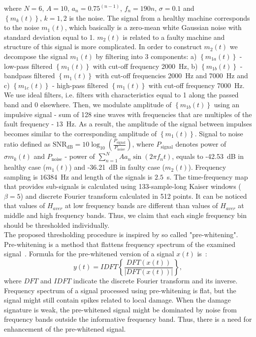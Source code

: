 where $N=6$, $A=10$, $a_n=0.75^{(n-1)}$, $f_n=190n$, $\sigma=0.1$ and $\left\{m_k(t)\right\},\,k=1,2$ is the noise. The signal from a healthy machine corresponds to the noise $m_1(t)$, which basically is a zero-mean white Gaussian noise with standard deviation equal to 1. $m_2(t)$ is related to a faulty machine and structure of this signal is more complicated. In order to construct $m_2(t)$ we decompose the signal $m_1(t)$ by filtering into 3 components: a) $\left\{m_{1a}(t)\right\}$ - low-pass filtered $\left\{m_1(t)\right\}$ with cut-off frequency 2000~Hz, b) $\left\{m_{1b}(t)\right\}$ - bandpass filtered $\left\{m_1(t)\right\}$ with cut-off frequencies 2000~Hz and 7000~Hz and c) $\left\{m_{1c}(t)\right\}$ - high-pass filtered $\left\{m_1(t)\right\}$ with cut-off frequency 7000~Hz. We use ideal filters, i.e. filters with characteristics equal to 1 along the passed band and 0 elsewhere. Then, we modulate amplitude of $\left\{m_{1b}(t)\right\}$ using an impulsive signal - sum of 128 sine waves with frequencies that are multiples of the fault frequency - $13$~Hz. As a result, the amplitude of the signal between impulses becomes similar to the corresponding amplitude of $\left\{m_1(t)\right\}$. Signal to noise ratio defined as $\mathrm{SNR_{dB}} = 10 \log_{10} \left ( \frac{P_\mathrm{signal}}{P_\mathrm{noise}} \right )$, where $P_\mathrm{signal}$ denotes power of $\sigma m_k(t)$ and $P_\mathrm{noise}$ - power of $\sum^{N}_{n=1}{ A a_n \sin(2\pi f_n t)}$, equals to -42.53~dB in healthy case ($m_1(t)$) and -36.21~dB in faulty case ($m_2(t)$). Frequency sampling is $16384$~Hz and length of the signals is $2.5$~s. The time-frequency map that provides sub-signals is calculated using 133-sample-long Kaiser windows ($\beta=5$) and discrete Fourier transform calculated in 512 points. It can be noticed that values of $H_{aver}$ at low frequency bands are different than values of $H_{aver}$ at middle and high frequency bands. Thus, we claim that each single frequency bin should be thresholded individually.\\
The proposed thresholding procedure is inspired by so called "pre-whitening". Pre-whitening is a method that flattens frequency spectrum of the examined signal~\cite{Sawalhi2005231,Sawalhi2011549,Sawalhi2011846}. Formula for the pre-whitened version of a signal $x(t)$ is~\cite{Borghesani2013370}:
\begin{equation}
y(t)=IDFT\left\{\frac{DFT\left(x(t)\right)}{\left|DFT\left(x(t)\right)\right|}\right\},
\end{equation}
where $DFT$ and $IDFT$  indicate the discrete Fourier transform and its inverse. Frequency spectrum of a signal processed using pre-whitening is flat, but the signal might still contain spikes related to local damage. When the damage signature is weak, the pre-whitened signal might be dominated by noise from frequency bands outside the informative frequency band. Thus, there is a need for enhancement of the pre-whitened signal.\\
